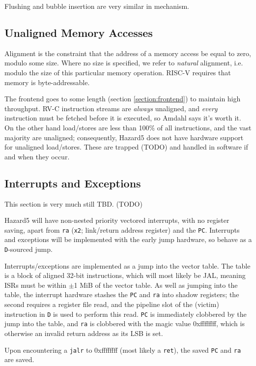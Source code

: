 Flushing and bubble insertion are very similar in mechanism.

\subsection{Unaligned Memory Accesses}

Alignment is the constraint that the address of a memory access be equal to zero, modulo some size. Where no size is specified, we refer to {\it natural} alignment, i.e. modulo the size of this particular memory operation. RISC-V requires that memory is byte-addressable.

The frontend goes to some length (section \ref{section:frontend}) to maintain high throughput. RV-C instruction streams are {\it always} unaligned, and {\it every} instruction must be fetched before it is executed, so Amdahl says it's worth it. On the other hand load/stores are less than 100\% of all instructions, and the vast majority are unaligned; consequently, Hazard5 does not have hardware support for unaligned load/stores. These are trapped (TODO) and handled in software if and when they occur.

\subsection{Interrupts and Exceptions}

This section is very much still TBD. (TODO)

Hazard5 will have non-nested priority vectored interrupts, with no register saving, apart from {\tt ra} ({\tt x2}; link/return address register) and the {\tt PC}. Interrupts and exceptions will be implemented with the early jump hardware, so behave as a {\tt D}-sourced jump.

Interrupts/exceptions are implemented as a jump into the vector table. The table is a block of aligned 32-bit instructions, which will most likely be JAL, meaning ISRs must be within $\pm$1 MiB of the vector table. As well as jumping into the table, the interrupt hardware stashes the {\tt PC} and {\tt ra} into shadow registers; the second requires a register file read, and the pipeline slot of the (victim) instruction in {\tt D} is used to perform this read. {\tt PC} is immediately clobbered by the jump into the table, and {\tt ra} is clobbered with the magic value 0xffffffff, which is otherwise an invalid return address as its LSB is set.

Upon encountering a {\tt jalr} to 0xffffffff (most likely a {\tt ret}), the saved {\tt PC} and {\tt ra} are saved.

